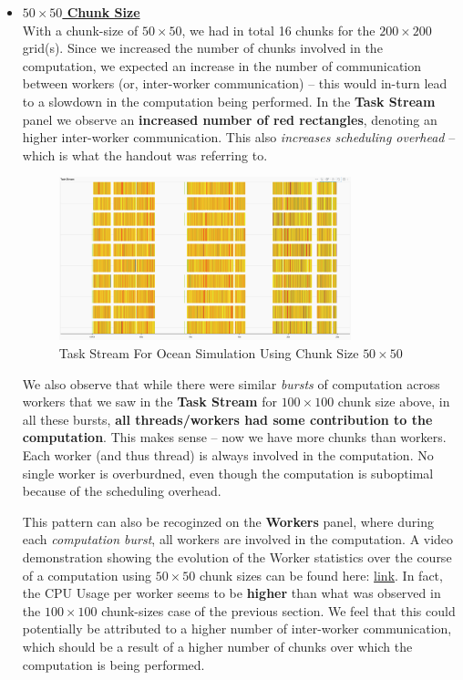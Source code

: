 \documentclass[a4paper,12pt]{article}
\begin{document}
\begin{itemize}
\item \textbf{\underline{$50 \times 50$ Chunk Size}} \\
  With a chunk-size of $50 \times 50$, we had in total 16 chunks for the $200 \times 200$ grid(s).
  Since we increased the number of chunks involved in the computation, we expected an increase in the number of communication between workers (or, inter-worker communication) -- this would in-turn lead to a slowdown in the computation being performed.
  In the \textbf{Task Stream} panel we observe an \textbf{increased number of red rectangles}, denoting an higher inter-worker communication.
  This also \textit{increases scheduling overhead} -- which is what the handout was referring to.

\begin{figure}[H]
  \centering
  \includegraphics[width=0.8\textwidth]{../images/task_stream_50chunk.png}
  \caption{Task Stream For Ocean Simulation Using Chunk Size $50 \times 50$}
\end{figure}

We also observe that while there were similar \textit{bursts} of computation across workers that we saw in the \textbf{Task Stream} for $100 \times 100$ chunk size above, in all these bursts, \textbf{all threads/workers had some contribution to the computation}.
This makes sense -- now we have more chunks than workers.
Each worker (and thus thread) is always involved in the computation.
No single worker is overburdned, even though the computation is suboptimal because of the scheduling overhead.

This pattern can also be recoginzed on the \textbf{Workers} panel, where during each \textit{computation burst}, all workers are involved in the computation.
A video demonstration showing the evolution of the Worker statistics over the course of a computation using $50 \times 50$ chunk sizes can be found here: \href{https://github.com/paulmyr/DD2358-HPC25/tree/master/04_parallel/bonus#chunk-size-50}{link}.
In fact, the CPU Usage per worker seems to be \textbf{higher} than what was observed in the $100 \times 100$ chunk-sizes case of the previous section.
We feel that this could potentially be attributed to a higher number of inter-worker communication, which should be a result of a higher number of chunks over which the computation is being performed. 


\end{itemize}
\end{document}
